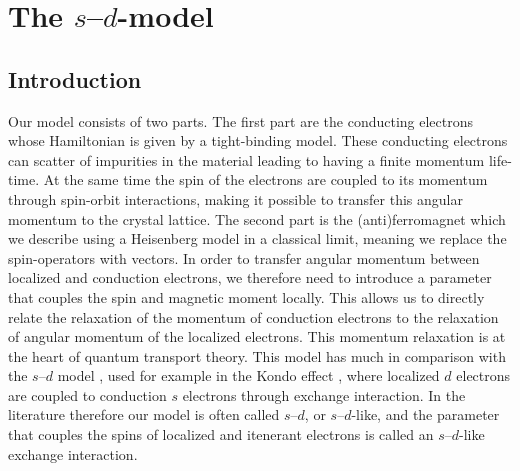 \chapter{The $s$--$d$-model}\label{ch:sdmodel}
\section{Introduction}
Our model consists of two parts. The first part are the conducting electrons whose Hamiltonian is given by a tight-binding model. These conducting electrons can scatter of impurities in the material leading to having a finite momentum life-time. At the same time the spin of the electrons are coupled to its momentum through spin-orbit interactions, making it possible to transfer this angular momentum to the crystal lattice. The second part is the (anti)ferromagnet which we describe using a Heisenberg model in a classical limit, meaning we replace the spin-operators with vectors. In order to transfer angular momentum between localized and conduction electrons, we therefore need to introduce a parameter that couples the spin and magnetic moment locally. This allows us to directly relate the relaxation of the momentum of conduction electrons to the relaxation of angular momentum of the localized electrons. This momentum relaxation is at the heart of quantum transport theory. This model has much in comparison with the $s$--$d$ model \cite{zener1951interaction,kasuya1956theory,yosida1957magnetic,sdmodel}, used for example in the Kondo effect \cite{10.1143/PTP.32.37}, where localized $d$ electrons are coupled to conduction $s$ electrons through exchange interaction. In the literature therefore our model is often called $s$--$d$, or $s$--$d$-like, and the parameter that couples the spins of localized and itenerant electrons is called an $s$--$d$-like exchange interaction. 

